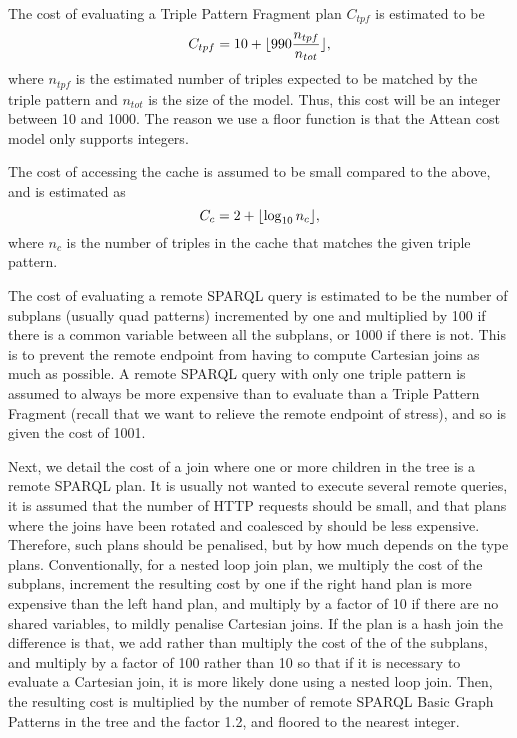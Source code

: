 The cost of evaluating a Triple Pattern Fragment plan $C_{tpf}$ is estimated to
be 
\begin{equation}
C_{tpf} = 10 + \lfloor 990 \frac{n_{tpf}}{n_{tot}} \rfloor ,
\end{equation}
where $n_{tpf}$ is the estimated number of triples expected to be
matched by the triple pattern and $n_{tot}$ is the size of the
model. Thus, this cost will be an integer between 10 and 1000. The
reason we use a floor function is that the Attean cost model only
supports integers.

The cost of accessing the cache is assumed to be small compared to the
above, and is estimated as 
\begin{equation}
C_c = 2 + \lfloor \log_{10}{n_c} \rfloor , 
\end{equation}
where $n_c$ is the number of triples in the cache that matches the
given triple pattern.

The cost of evaluating a remote SPARQL query is estimated to be the
number of subplans (usually quad patterns) incremented by one and
multiplied by 100 if there is a common variable between all the
subplans, or 1000 if there is not. This is to prevent the remote
endpoint from having to compute Cartesian joins as much as possible. A
remote SPARQL query with only one triple pattern is assumed to always
be more expensive than to evaluate than a Triple Pattern Fragment
(recall that we want to relieve the remote endpoint of stress), and so
is given the cost of 1001.


Next, we detail the cost of a join where one or more children in the
tree is a remote SPARQL plan. It is usually not wanted to execute
several remote queries, it is assumed that the number of HTTP requests
should be small, and that plans where the joins have been rotated and
coalesced by  should be
less expensive. Therefore, such plans should be penalised, but by how
much depends on the type plans. Conventionally, for a nested loop join
plan, we multiply the cost of the subplans, increment the resulting
cost by one if the right hand plan is more expensive than the left
hand plan, and multiply by a factor of 10 if there are no shared
variables, to mildly penalise Cartesian joins. If the plan is a hash
join the difference is that, we add rather than multiply the cost of
the of the subplans, and multiply by a factor of 100 rather than 10 so
that if it is necessary to evaluate a Cartesian join, it is more
likely done using a nested loop join. Then, the resulting cost is
multiplied by the number of remote SPARQL Basic Graph Patterns in the
tree and the factor 1.2, and floored to the nearest integer.

